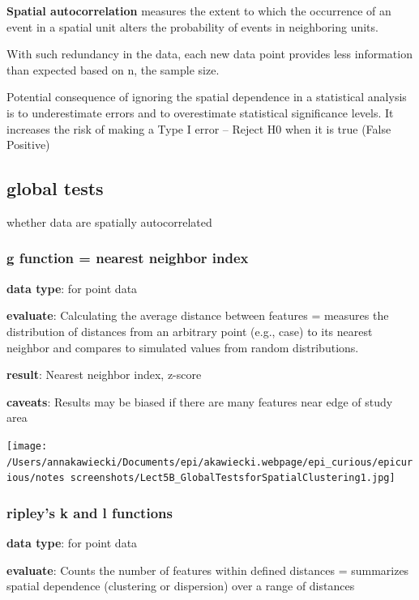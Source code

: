 \documentclass[
]{article}
\begin{document}
\textbf{Spatial autocorrelation} measures the extent to which the
occurrence of an event in a spatial unit alters the probability of
events in neighboring units.

With such redundancy in the data, each new data point provides less
information than expected based on n, the sample size.

Potential consequence of ignoring the spatial dependence in a
statistical analysis is to underestimate errors and to overestimate
statistical significance levels. It increases the risk of making a Type
I error -- Reject H0 when it is true (False Positive)

\hypertarget{global-tests}{%
\subsection{global tests}\label{global-tests}}

whether data are spatially autocorrelated

\hypertarget{g-function-nearest-neighbor-index}{%
\subsubsection{g function = nearest neighbor
index}\label{g-function-nearest-neighbor-index}}

\textbf{data type}: for point data

\textbf{evaluate}: Calculating the average distance between features =
measures the distribution of distances from an arbitrary point (e.g.,
case) to its nearest neighbor and compares to simulated values from
random distributions.

\textbf{result}: Nearest neighbor index, z-score

\textbf{caveats}: Results may be biased if there are many features near
edge of study area

\texttt{[image: /Users/annakawiecki/Documents/epi/akawiecki.webpage/epi\_curious/epicurious/notes screenshots/Lect5B\_GlobalTestsforSpatialClustering1.jpg]}

\hypertarget{ripleys-k-and-l-functions}{%
\subsubsection{ripley's k and l
functions}\label{ripleys-k-and-l-functions}}

\textbf{data type}: for point data

\textbf{evaluate}: Counts the number of features within defined
distances = summarizes spatial dependence (clustering or dispersion)
over a range of distances
\end{document}
